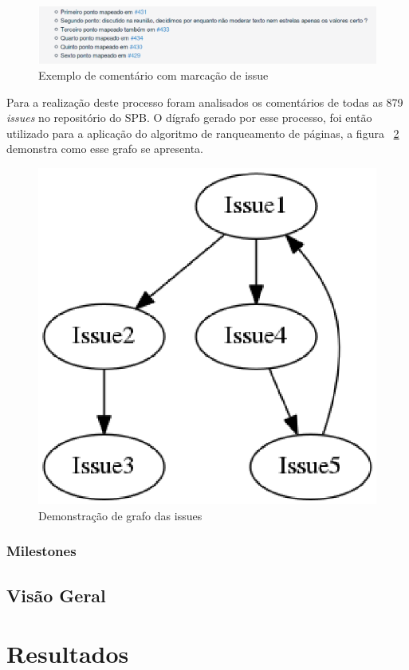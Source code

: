 \begin{figure}[h]
    \centering
        \includegraphics[keepaspectratio=true,scale=0.5]{figuras/issue-comment.eps}
    \caption{Exemplo de comentário com marcação de issue}
    \label{fig:issue-comment}
\end{figure}

Para a realização deste processo foram analisados os comentários de todas as 879
\textit{issues} no repositório do SPB. O dígrafo gerado por esse processo, foi
então utilizado para a aplicação do algoritmo de ranqueamento de páginas, a figura
~\ref{fig:issue-graph} demonstra como esse grafo se apresenta.

\begin{figure}[h]
    \centering
        \includegraphics[keepaspectratio=true,scale=0.5]{figuras/issue-graph.eps}
    \caption{Demonstração de grafo das issues}
    \label{fig:issue-graph}
\end{figure}


\subsubsection{Milestones}
\label{est:ran:ver}

\subsection{Visão Geral}
\label{est:ran:vis}

\section{Resultados}
\label{est:res}
